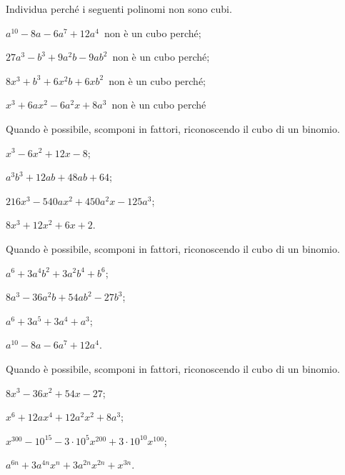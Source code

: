 \begin{multicols}{2}
\begin{esercizio}
\label{ese:16.24}
Individua perché i seguenti polinomi non sono cubi.
\begin{enumeratea}
 \item $a^{10}-8a-6a^{7}+12a^{4}$\, non è un cubo perché\dotfill;
 \item $27a^{3}-b^{3}+9a^{2}b-9ab^{2}$\, non è un cubo perché\dotfill;
 \item $8x^{3}+b^{3}+6x^{2}b+6{xb}^{2}$\, non è un cubo perché\dotfill;
 \item $x^{3}+6ax^{2}-6a^{2}x+8a^{3}$\, non è un cubo perché\dotfill
\end{enumeratea}
\end{esercizio}

\begin{esercizio}
\label{ese:16.25}
Quando è possibile, scomponi in fattori, riconoscendo il cubo di un binomio.
\begin{enumeratea}
 \item $x^{3}-6x^{2}+12x-8$;
 \item $a^{3}b^{3}+12ab+48ab+64$;
 \item $216x^{3}-540ax^{2}+450a^{2}x-125a^{3}$;
 \item $8x^{3}+12x^{2}+6x+2$.
\end{enumeratea}
\end{esercizio}

\begin{esercizio}[\Ast]
\label{ese:16.26}
Quando è possibile, scomponi in fattori, riconoscendo il cubo di un binomio.
\begin{enumeratea}
 \item $a^{6}+3a^{4}b^{2}+3a^{2}b^{4}+b^{6}$;
 \item $8a^{3}-36a^{2}b+54ab^{2}-27b^{3}$;
 \item $a^{6}+3a^{5}+3a^{4}+a^{3}$;
 \item $a^{10}-8a-6a^{7}+12a^{4}$.%
\end{enumeratea}
\end{esercizio}

\begin{esercizio}
\label{ese:16.27}
Quando è possibile, scomponi in fattori, riconoscendo il cubo di un binomio.
\begin{enumeratea}
 \item $8x^{3}-36x^{2}+54x-27$;
 \item $x^{6}+12ax^{4}+12a^{2}x^{2}+8a^{3}$;
 \item $x^{300}-10^{15}-3\cdot 10^{5}x^{200}+3\cdot 10^{10}x^{100}$;
 \item $a^{6n}+3a^{4n}x^{n}+3a^{2n}x^{2n}+x^{3n}$.
\end{enumeratea}
\end{esercizio}
\end{multicols}
